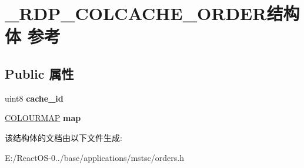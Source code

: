 \hypertarget{struct___r_d_p___c_o_l_c_a_c_h_e___o_r_d_e_r}{}\section{\+\_\+\+R\+D\+P\+\_\+\+C\+O\+L\+C\+A\+C\+H\+E\+\_\+\+O\+R\+D\+E\+R结构体 参考}
\label{struct___r_d_p___c_o_l_c_a_c_h_e___o_r_d_e_r}
\subsection*{Public 属性}
\begin{DoxyCompactItemize}
\item 
\mbox{\label{struct___r_d_p___c_o_l_c_a_c_h_e___o_r_d_e_r_a3813c9e4a5b947da497c4230eb995f2a}} 
uint8 {\bfseries cache\+\_\+id}
\item 
\mbox{\label{struct___r_d_p___c_o_l_c_a_c_h_e___o_r_d_e_r_aede1018b901b8352fbf41a111675f144}} 
\hyperlink{struct___c_o_l_o_u_r_m_a_p}{C\+O\+L\+O\+U\+R\+M\+AP} {\bfseries map}
\end{DoxyCompactItemize}


该结构体的文档由以下文件生成\+:\begin{DoxyCompactItemize}
\item 
E\+:/\+React\+O\+S-\/0../base/applications/mstsc/orders.\+h\end{DoxyCompactItemize}
